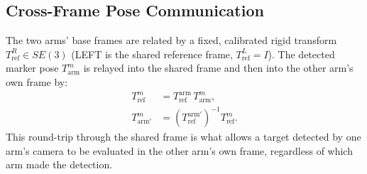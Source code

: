 \documentclass[letterpaper, 10 pt, conference]{ieeeconf}  %
\begin{document}
\subsection{Cross-Frame Pose Communication}
\label{cross_frame}
The two arms' base frames are related by a fixed, calibrated rigid transform $T_{\text{ref}}^{R}\in SE(3)$ (LEFT is the shared reference frame, $T_{\text{ref}}^{L}=I$). The detected marker pose $T_{\text{arm}}^{m}$ is relayed into the shared frame and then into the other arm's own frame by:
\begin{equation}
\begin{aligned}
T^{m}_{\text{ref}}
&= T^{\text{arm}}_{\text{ref}}\,T^{m}_{\text{arm}}, \\
T^{m}_{{\text{arm}}'}
&= \left (T^{\text{arm}'}_{\text{ref}}\right)^{-1}
T^{m}_{\text{ref}}.
\end{aligned}
\end{equation}
This round-trip through the shared frame is what allows a target detected by one
arm's camera to be evaluated in the other arm's own frame, regardless of which arm
made the detection.
\end{document}
